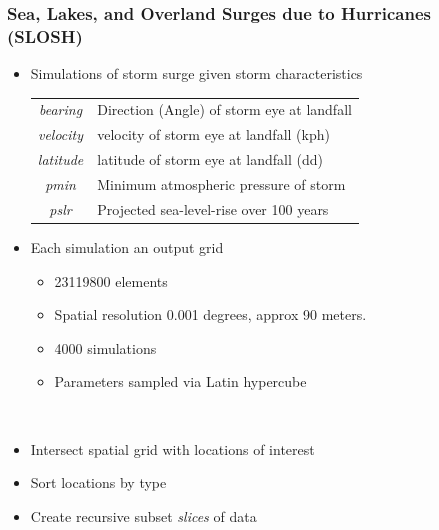 \documentclass[aspectratio=169,10pt,notes]{beamer}
\begin{document}
\begin{frame}
    \frametitle{Sea, Lakes, and Overland Surges due to Hurricanes (SLOSH)}
    \begin{minipage}{0.54\textwidth}
    {\footnotesize
    \begin{itemize}
        \item Simulations of storm surge given storm characteristics \par
        \begin{tabular}{cl}
            \textit{bearing}  & Direction (Angle) of storm eye at landfall \\
            \textit{velocity} & velocity of storm eye at landfall (kph)    \\
            \textit{latitude} & latitude of storm eye at landfall (dd)     \\
            \textit{pmin}     & Minimum atmospheric pressure of storm      \\
            \textit{pslr}     & Projected sea-level-rise over 100 years    \\
            \end{tabular}
        \item Each simulation an output grid
        \begin{itemize}
            \item \num{23119800} elements
            \item Spatial resolution 0.001 degrees, approx 90 meters.
        \item 4000 simulations
        \item Parameters sampled via Latin hypercube
        \end{itemize}
    \end{itemize}
    }
    \end{minipage}%
    ~
    \begin{minipage}{0.44\textwidth}
        {\footnotesize
        \begin{itemize}
            \item Intersect spatial grid with locations of interest
            \item Sort locations by type
            \item Create recursive subset \emph{slices} of data
            \begin{center}
            {\scriptsize
            
            }
            \end{center}
            
            \vfill
            
            ~
        \end{itemize}
        
        }
    \end{minipage}
\end{frame} %
\end{document}
